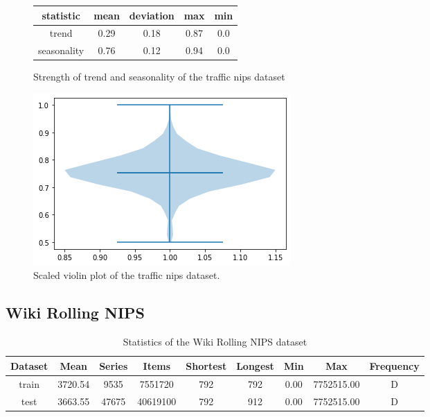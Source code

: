 \begin{figure}[htb]
    \centering
        \begin{center}
            \begin{tabular}{||c | c | c | c | c |} 
                \hline
                statistic & mean & deviation & max & min\\
                \hline
                trend & 0.29 & 0.18 & 0.87 & 0.0 \\
                \hline
                seasonality & 0.76 & 0.12 & 0.94 & 0.0 \\
                \hline
                \hline
            \end{tabular}
            \caption{Strength of trend and seasonality of the traffic nips dataset}
        \end{center}
    \endminipage\hfill
      \includegraphics[width=\linewidth]{4_designing/figures/traffic_nips_violin.png}
      \caption{Scaled violin plot of the traffic nips dataset.}
      \label{fig:traffic_nips_violin}
    \endminipage\hfill
\end{figure}
\clearpage
\subsection{Wiki Rolling NIPS}

\begin{table}[htb]
    \begin{tabular}{||c | c c c c c c c c ||} 
        \hline
       Dataset & Mean & Series & Items & Shortest & Longest & Min & Max & Frequency\\ [0.5ex] 
        \hline\hline
        train & 3720.54 & 9535 & 7551720 & 792 & 792 & 0.00 & 7752515.00 & D\\ 
        \hline
        test & 3663.55 & 47675 & 40619100 & 792 & 912 & 0.00 & 7752515.00 & D\\
        \hline
    \end{tabular}
   \caption{Statistics of the Wiki Rolling NIPS dataset}
\end{table}


